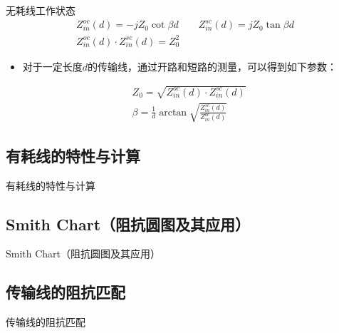 \begin{frame}{无耗线工作状态}
  \begin{align*}
    Z_{in}^{oc}(d)=-jZ_{0}\cot\beta d \qquad Z_{in}^{sc}(d)=jZ_{0}\tan\beta d\\
    Z_{in}^{oc}(d)\cdot Z_{in}^{sc}(d)=Z_{0}^{2}
  \end{align*}
  \begin{itemize}
    \item 对于一定长度$d$的传输线，通过开路和短路的测量，可以得到如下参数：
  \end{itemize}
  \begin{align*}
    &Z_{0}=\sqrt{Z_{in}^{oc}(d)\cdot Z_{in}^{sc}(d)}\\
    &\beta=\frac{1}{d}\arctan\sqrt{\frac{Z_{in}^{sc}(d)}{Z_{in}^{oc}(d)}}
  \end{align*}
\end{frame}

\subsection{有耗线的特性与计算}
\begin{frame}{有耗线的特性与计算}

\end{frame}

\subsection{Smith Chart（阻抗圆图及其应用）}
\begin{frame}{Smith Chart（阻抗圆图及其应用）}

\end{frame}

\subsection{传输线的阻抗匹配}
\begin{frame}{传输线的阻抗匹配}

\end{frame}
